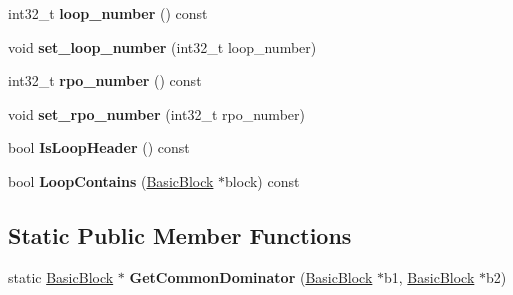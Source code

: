 \begin{DoxyCompactItemize}
\item 
int32\+\_\+t {\bfseries loop\+\_\+number} () const \hypertarget{classv8_1_1internal_1_1compiler_1_1_basic_block_a7730c3c4c50266ab450ffd86f8102c3b}{}\label{classv8_1_1internal_1_1compiler_1_1_basic_block_a7730c3c4c50266ab450ffd86f8102c3b}

\item 
void {\bfseries set\+\_\+loop\+\_\+number} (int32\+\_\+t loop\+\_\+number)\hypertarget{classv8_1_1internal_1_1compiler_1_1_basic_block_a75b25f19c506fd7fc2560d5e46a0ad3c}{}\label{classv8_1_1internal_1_1compiler_1_1_basic_block_a75b25f19c506fd7fc2560d5e46a0ad3c}

\item 
int32\+\_\+t {\bfseries rpo\+\_\+number} () const \hypertarget{classv8_1_1internal_1_1compiler_1_1_basic_block_a99b20ce981cb2bcc0f3a45a24435888b}{}\label{classv8_1_1internal_1_1compiler_1_1_basic_block_a99b20ce981cb2bcc0f3a45a24435888b}

\item 
void {\bfseries set\+\_\+rpo\+\_\+number} (int32\+\_\+t rpo\+\_\+number)\hypertarget{classv8_1_1internal_1_1compiler_1_1_basic_block_ad2bfc68aaefb8822e33a417ad917f6d9}{}\label{classv8_1_1internal_1_1compiler_1_1_basic_block_ad2bfc68aaefb8822e33a417ad917f6d9}

\item 
bool {\bfseries Is\+Loop\+Header} () const \hypertarget{classv8_1_1internal_1_1compiler_1_1_basic_block_ad4a1a49e36f90579c68763679270c741}{}\label{classv8_1_1internal_1_1compiler_1_1_basic_block_ad4a1a49e36f90579c68763679270c741}

\item 
bool {\bfseries Loop\+Contains} (\hyperlink{classv8_1_1internal_1_1compiler_1_1_basic_block}{Basic\+Block} $\ast$block) const \hypertarget{classv8_1_1internal_1_1compiler_1_1_basic_block_aa55b6864a6727838f2bfd1aa8f053304}{}\label{classv8_1_1internal_1_1compiler_1_1_basic_block_aa55b6864a6727838f2bfd1aa8f053304}

\end{DoxyCompactItemize}
\subsection*{Static Public Member Functions}
\begin{DoxyCompactItemize}
\item 
static \hyperlink{classv8_1_1internal_1_1compiler_1_1_basic_block}{Basic\+Block} $\ast$ {\bfseries Get\+Common\+Dominator} (\hyperlink{classv8_1_1internal_1_1compiler_1_1_basic_block}{Basic\+Block} $\ast$b1, \hyperlink{classv8_1_1internal_1_1compiler_1_1_basic_block}{Basic\+Block} $\ast$b2)\hypertarget{classv8_1_1internal_1_1compiler_1_1_basic_block_aeab48d8c28877fcbf905f22222668007}{}\label{classv8_1_1internal_1_1compiler_1_1_basic_block_aeab48d8c28877fcbf905f22222668007}

\end{DoxyCompactItemize}
